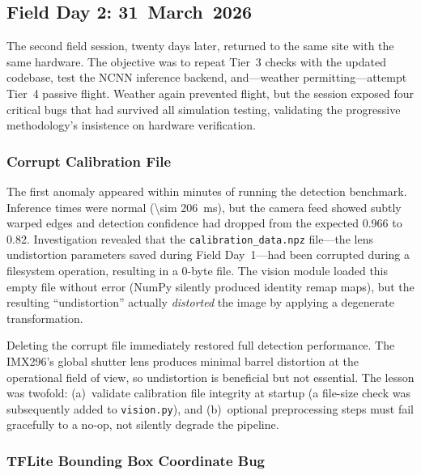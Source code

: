 \subsection{Field Day 2: 31~March~2026}\label{sec:field-day-2}

The second field session, twenty days later, returned to the same site with the same hardware.  The objective was to repeat Tier~3 checks with the updated codebase, test the NCNN inference backend, and---weather permitting---attempt Tier~4 passive flight.  Weather again prevented flight, but the session exposed four critical bugs that had survived all simulation testing, validating the progressive methodology's insistence on hardware verification.

\subsubsection{Corrupt Calibration File}\label{sec:field-corrupt}

The first anomaly appeared within minutes of running the detection benchmark.  Inference times were normal (\SI{\sim 206}{\milli\second}), but the camera feed showed subtly warped edges and detection confidence had dropped from the expected 0.966 to 0.82.  Investigation revealed that the \texttt{calibration\_data.npz} file---the lens undistortion parameters saved during Field Day~1---had been corrupted during a filesystem operation, resulting in a 0-byte file.  The vision module loaded this empty file without error (NumPy silently produced identity remap maps), but the resulting ``undistortion'' actually \emph{distorted} the image by applying a degenerate transformation.

Deleting the corrupt file immediately restored full detection performance.  The IMX296's global shutter lens produces minimal barrel distortion at the operational field of view, so undistortion is beneficial but not essential.  The lesson was twofold: (a)~validate calibration file integrity at startup (a file-size check was subsequently added to \texttt{vision.py}), and (b)~optional preprocessing steps must fail gracefully to a no-op, not silently degrade the pipeline.

\subsubsection{TFLite Bounding Box Coordinate Bug}\label{sec:field-bbox}

